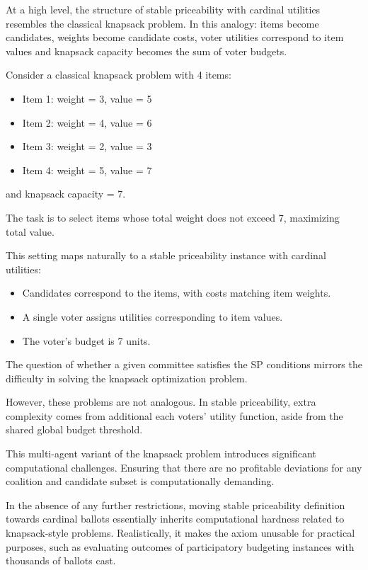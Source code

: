At a high level, the structure of stable priceability with cardinal utilities resembles the classical knapsack problem. In this analogy: items become candidates, weights become candidate costs, voter utilities correspond to item values and knapsack capacity becomes the sum of voter budgets.
\begin{example}
Consider a classical knapsack problem with 4 items:
\begin{itemize}
    \item Item 1: weight = 3, value = 5
    \item Item 2: weight = 4, value = 6
    \item Item 3: weight = 2, value = 3
    \item Item 4: weight = 5, value = 7
\end{itemize}
and knapsack capacity = 7.

The task is to select items whose total weight does not exceed 7, maximizing total value.

This setting maps naturally to a stable priceability instance with cardinal utilities:

\begin{itemize}
    \item Candidates correspond to the items, with costs matching item weights.
    \item A single voter assigns utilities corresponding to item values.
    \item The voter's budget is 7 units.
\end{itemize}

The question of whether a given committee satisfies the SP conditions mirrors the difficulty in solving the knapsack optimization problem.
\end{example}


However, these problems are not analogous. In stable priceability, extra complexity comes from additional each voters' utility function, aside from the shared global budget threshold.

This multi-agent variant of the knapsack problem introduces significant computational challenges. Ensuring that there are no profitable deviations for any coalition and candidate subset is computationally demanding.

In the absence of any further restrictions, moving stable priceability definition towards cardinal ballots essentially inherits computational hardness related to knapsack-style problems. Realistically, it makes the axiom unusable for practical purposes, such as evaluating outcomes of participatory budgeting instances with thousands of ballots cast.
